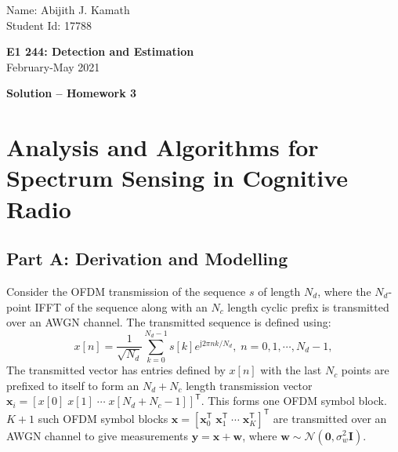 \documentclass[11pt]{article}
\newcommand{\by}{\mathbf{y}}
\newcommand{\bx}{\mathbf{x}}
\newcommand{\bw}{\mathbf{w}}
\newcommand{\TT}{\mathsf{T}}
\newcommand{\jj}{\mathrm{j}}
\newcommand{\zerovec}{\boldsymbol{0}}
\begin{document}
\thispagestyle{empty}

{\small
\begin{flushleft}
   Name: Abijith J. Kamath\\
   Student Id: 17788
\end{flushleft}
}
\vspace{2ex}
\begin{center}
    {\Large\bf E1 244: Detection and Estimation}\\
    February-May 2021

\vspace{5mm}
{\bf Solution -- Homework 3}
\end{center}
\vspace{5mm}

\section*{Analysis and Algorithms for Spectrum Sensing in Cognitive Radio}


\subsection*{Part A: Derivation and Modelling}
\label{subsec:partA}

Consider the OFDM transmission of the sequence $s$ of length $N_{d}$, where the $N_{d}$-point IFFT of the sequence along with an $N_{c}$ length cyclic prefix is transmitted over an AWGN channel. The transmitted sequence is defined using:
\begin{equation}
	x[n] = \frac{1}{\sqrt{N_{d}}} \sum_{k=0}^{N_{d}-1} s[k] e^{\jj 2\pi nk/N_{d}}, \; n=0,1,\cdots, N_{d}-1,
\label{eq:transmittedSignal}
\end{equation}
The transmitted vector has entries defined by $x[n]$ with the last $N_{c}$ points are prefixed to itself to form an $N_{d}+N_{c}$ length transmission vector $\bx_{i} = \left[ x[0] \; x[1] \; \cdots \; x[N_{d}+N_{c}-1] \right]^{\TT}$. This forms one OFDM symbol block. $K+1$ such OFDM symbol blocks $\bx = [\bx_{0}^{\TT} \; \bx_{1}^{\TT} \; \cdots \; \bx_{K}^{\TT}]^{\TT}$ are transmitted over an AWGN channel to give measurements $\by = \bx + \bw$, where $\bw \sim \mathcal{N}(\zerovec, \sigma_{w}^{2} \mathbf{I})$.
\end{document}
